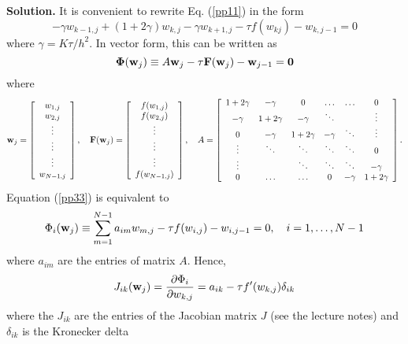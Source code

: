 \documentclass[10pt]{article}
\def\bw{{\bf w}}
\def\bF{{\bf F}}
\def\pr{{\partial}}
\def\bPhi{\boldsymbol{\Phi}}
\begin{document}
\vskip 0.5cm \noindent
{\bf Solution.} It is convenient to rewrite Eq. (\ref{pp11}) in the form
\begin{equation}
-\gamma w_{k-1,j}+(1+2\gamma)w_{k,j}-\gamma w_{k+1,j} - \tau f(w_{kj}) - w_{k,j-1}=0 \label{pp33}
\end{equation}
where $\gamma=K\tau/h^2$. In vector form, this can be written as
\begin{equation}
\bPhi(\bw_j)\equiv A\bw_j - \tau \bF(\bw_{j}) - \bw_{j-1}={\bf 0} \label{pp44}
\end{equation}
where
\[
{\bf w}_{j}=\left[
\begin{array}{c}
w_{1,j} \\
w_{2,j} \\
\vdots \\
\vdots \\
\vdots \\
w_{N-1,j}
\end{array}\right], \quad
{\bf F}(\bw_{j})=
\left[
\begin{array}{c}
f(w_{1,j}) \\
f(w_{2,j}) \\
\vdots \\
\vdots \\
\vdots \\
f(w_{N-1,j})
\end{array}\right], \quad
A=\left[
\begin{array}{cccccc}
1+2\gamma & -\gamma &0      &\dots  &\dots &0 \\
-\gamma &1+2\gamma &-\gamma &\ddots  &     &\vdots \\
0      &-\gamma &1+2\gamma &-\gamma &\ddots &\vdots \\
\vdots &\ddots &\ddots &\ddots &\ddots &0 \\
\vdots &       &\ddots &\ddots &\ddots &-\gamma \\
0      &\dots  &\dots  &0   &-\gamma   &1+2\gamma
\end{array}\right].
\]
Equation (\ref{pp33}) is equivalent to
\begin{equation}
\Phi_{i}(\bw_j)\equiv \sum_{m=1}^{N-1}a_{im}w_{m,j}-\tau f(w_{i,j})-w_{i,j-1}=0, \quad i=1,\dots,N-1 \label{pp44}
\end{equation}
where $a_{im}$ are the entries of matrix $A$. Hence,
\begin{equation}
J_{ik}(\bw_j)=\frac{\pr \Phi_{i}}{\pr w_{k,j}} = a_{ik}-\tau f'(w_{k,j})\delta_{ik} \label{pp55}
\end{equation}
where the $J_{ik}$ are the entries of the Jacobian matrix $J$ (see the lecture notes) and $\delta_{ik}$ is the Kronecker delta
\end{document}
